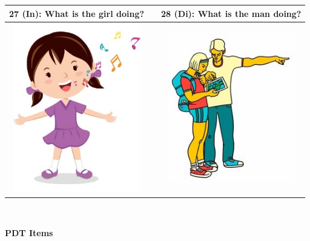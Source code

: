 \begin{tabular}{|c|c|c|}
\hline
27 (In): What is the girl doing? && 28 (Di): What is the man doing? \\
\hline
\includegraphics[width=15em,trim=0 0 0 -3]{figures/I27.jpg} & & \includegraphics[width=15em,trim=0 0 0 -3]{figures/I28.jpg} \\
\hline
\end{tabular}
\vspace{1em} \\


\clearpage

{\large \textbf{PDT Items}}

\vspace{2em}

